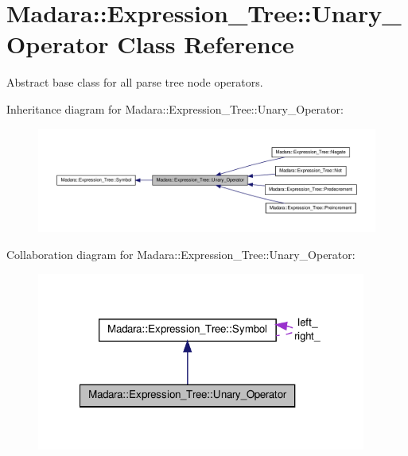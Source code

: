 \hypertarget{classMadara_1_1Expression__Tree_1_1Unary__Operator}{
\section{Madara::Expression\_\-Tree::Unary\_\-Operator Class Reference}
\label{da/de9/classMadara_1_1Expression__Tree_1_1Unary__Operator}
}


Abstract base class for all parse tree node operators.  




Inheritance diagram for Madara::Expression\_\-Tree::Unary\_\-Operator:
\nopagebreak
\begin{figure}[H]
\begin{center}
\leavevmode
\includegraphics[width=400pt]{d0/d32/classMadara_1_1Expression__Tree_1_1Unary__Operator__inherit__graph}
\end{center}
\end{figure}


Collaboration diagram for Madara::Expression\_\-Tree::Unary\_\-Operator:
\nopagebreak
\begin{figure}[H]
\begin{center}
\leavevmode
\includegraphics[width=307pt]{d7/dd3/classMadara_1_1Expression__Tree_1_1Unary__Operator__coll__graph}
\end{center}
\end{figure}
